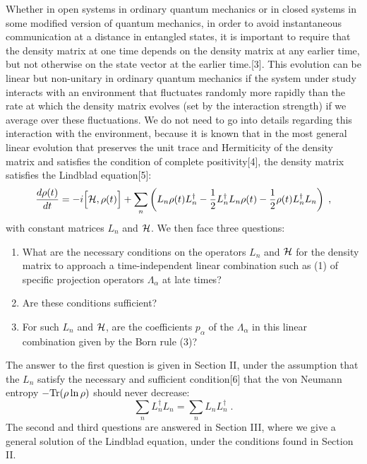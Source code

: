Whether in  open systems in ordinary quantum mechanics or in closed systems in some modified version of quantum mechanics,  in order to avoid instantaneous communication at a distance in entangled states, it is important to require that the density matrix at one time depends  on the density matrix at any earlier time, but not otherwise on  the state vector at the earlier time.[3].  This evolution can be linear but non-unitary in ordinary quantum mechanics if the system under study interacts with an environment that fluctuates randomly more rapidly than the rate at which the density matrix evolves (set by the interaction strength) if we average over these fluctuations.   We do not need to go into details regarding this interaction with the environment, because it is known that in the most general linear evolution that preserves the unit trace and Hermiticity of the density matrix and satisfies the condition of complete positivity[4], the density matrix satisfies the Lindblad equation[5]:
\begin{equation}
\frac{d\rho(t)}{dt}=-i\Big[{\cal H},\rho(t)\Big]+\sum_n \left(L_n\rho(t)L_n^\dagger-\frac{1}{2}L_n^\dagger L_n \rho(t)
-\frac{1}{2}\rho(t) L_n^\dagger L_n\right)\;,
\end{equation}
with constant matrices $L_n$ and ${\cal H}$.  
We then face three questions:
\begin{enumerate}
  \item What are the necessary conditions on the operators  $L_n$  and ${\cal H}$ for  the density matrix to approach a time-independent linear combination such as (1) of specific projection operators $\Lambda_\alpha$ at late times?
  \item  Are these conditions sufficient?  
  \item For such $L_n$  and ${\cal H}$, are the coefficients $p_\alpha$ of the $\Lambda_\alpha$ in this linear combination given by the Born rule (3)? 
 \end{enumerate}  
The answer to the first question is given in Section II, under the assumption that the $L_n$ satisfy the necessary and sufficient condition[6] that the von Neumann entropy $-{\rm Tr}(\rho\ln\rho)$ should never decrease:
\begin{equation}
\sum_n L_n^\dagger L_n=\sum_n L_n L^\dagger_n\;.
\end{equation}
The second and third questions are answered in Section III, where we give a general solution of the Lindblad equation, under the conditions found in Section II.



